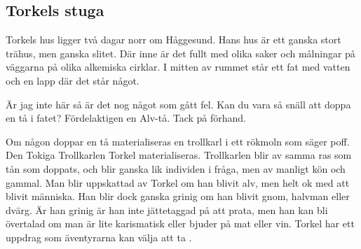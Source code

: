 \subsection{Torkels stuga}
\label{torkelsStuga}
Torkels hus ligger två dagar norr om Håggesund. Hans hus är ett ganska stort trähus, men ganska slitet. Där inne är det fullt med olika saker och målningar på väggarna på olika alkemiska cirklar.
I mitten av rummet står ett fat med vatten och en lapp där det står något.
%
\begin{displayquote}
Är jag inte här så är det nog något som gått fel. Kan du vara så snäll att doppa en tå i fatet? Fördelaktigen en Alv-tå. Tack på förhand.
\end{displayquote}
%
Om någon doppar en tå materialiseras en trollkarl i ett rökmoln som säger poff. Den Tokiga Trollkarlen Torkel materialiseras. Trollkarlen blir av samma ras som tån som doppats, och blir ganska lik individen i fråga, men av manligt kön och gammal. Man blir uppskattad av Torkel om han blivit alv, men helt ok med att blivit människa. Han blir dock ganska grinig om han blivit gnom, halvman eller dvärg. Är han grinig är han inte jättetaggad på att prata, men han kan bli övertalad om man är lite karismatisk eller bjuder på mat eller vin. Torkel har ett uppdrag som äventyrarna kan välja att ta .